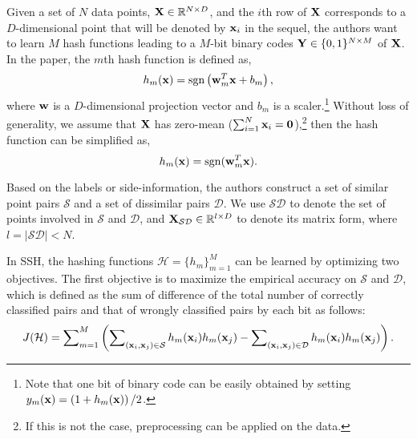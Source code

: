 Given a set of $N$ data points, ${\bf X} \in \mathbb{R}^{N\times D}$, and the $i$th row of ${\bf X}$ corresponds to a $D$-dimensional point that will be denoted by ${\bf x}_i$ in the sequel, the authors want to learn $M$ hash functions leading to a $M$-bit binary codes ${\bf Y} \in \{0,1\}^{N\times M}$ of ${\bf X}$. In the paper, the $m$th hash function is defined as,
$$h_{m}({\bf x}) = \mathop{\rm sgn}\left({\bf w}^T_{m}{\bf x}+b_{m}\right),$$
where ${\bf w}$ is a $D$-dimensional projection vector and $b_{m}$ is a scaler.\footnote{Note that one bit of binary code can be easily obtained by setting $y_m({\bf x}) = \left(1+h_{m}({\bf x})\right)/2$.} Without loss of generality, we assume that ${\bf X}$ has zero-mean ($\sum_{i=1}^{N}{\bf x}_i={\bf 0}$),\footnote{If this is not the case, preprocessing can be applied on the data.} then the hash function can be simplified as,
$$h_{m}({\bf x}) = \mathop{\rm sgn}({\bf w}^T_{m}{\bf x}).$$

Based on the labels or side-information, the authors construct a set of similar point pairs $\mathcal{S}$ and a set of dissimilar pairs $\mathcal{D}$. We use $\mathcal{SD}$ to denote the set of points involved in $\mathcal{S}$ and $\mathcal{D}$,  and ${\bf X}_{\mathcal{SD}}\in \mathbb{R}^{l\times D}$ to denote its matrix form, where $l = |\mathcal{SD}|<N$.


In \mbox{SSH}, the hashing functions $\mathcal{H} = \{h_m\}_{m=1}^M$ can be learned by optimizing two objectives. The first objective is to maximize the empirical accuracy on $\mathcal{S}$ and $\mathcal{D}$, which is defined as the sum of difference of the total number of correctly classified pairs and that of wrongly classified pairs by each bit as follows:
\begin{align}
J(\mathcal{H}) = \sum\nolimits_{m=1}\nolimits^M\left(\sum\nolimits_{({\bf x}_i,{\bf x}_j)\in\mathcal{S}}h_m({\bf x}_i)h_m({\bf x}_j) - \sum\nolimits_{({\bf x}_i,{\bf x}_j)\in\mathcal{D}}h_m({\bf x}_i)h_m({\bf x}_j)\right).\nonumber
\end{align}

